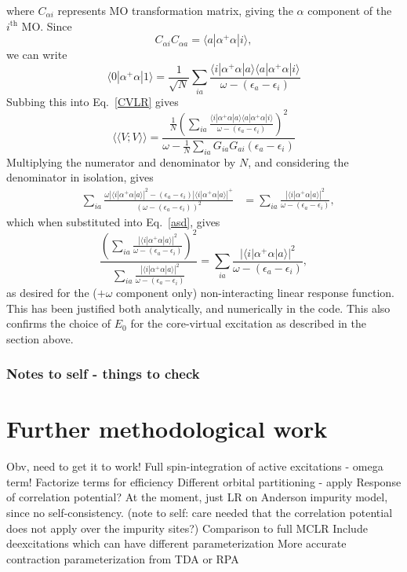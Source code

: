 \documentclass[a4paper,oneside,11pt]{article}
\numberwithin{equation}{section}
\begin{document}
where $C_{\alpha i}$ represents MO transformation matrix, giving the $\alpha$ component of the $i^{\textrm{th}}$ MO.
Since
\begin{equation}
C_{\alpha i} C_{\alpha a} = \langle a | \alpha^{+} \alpha | i \rangle ,
\end{equation}
we can write
\begin{equation}
\langle 0 | \alpha^{+} \alpha | 1 \rangle = \frac{1}{\sqrt{N}} \sum_{ia} \frac{\langle i | \alpha^{+} \alpha | a \rangle \langle a | \alpha^{+} \alpha | i \rangle}{\omega - (\epsilon_a - \epsilon_i)}
\end{equation}
Subbing this into Eq.~\ref{CVLR} gives
\begin{equation}
\langle \langle V ; V \rangle \rangle = \frac{ \frac{1}{N} \left( \sum_{ia} \frac{\langle i | \alpha^{+} \alpha | a \rangle \langle a | \alpha^{+} \alpha | i \rangle }{ \omega - (\epsilon_a - \epsilon_i)} \right)^2}{\omega - \frac{1}{N} \sum_{ia} G_{ia} G_{ai} (\epsilon_a - \epsilon_i)} \label{asd}
\end{equation}
Multiplying the numerator and denominator by $N$, and considering the denominator in isolation, gives
\begin{align}
& \sum_{ia} \frac{\omega|\langle i | \alpha^{+} \alpha | a \rangle |^2 - (\epsilon_a - \epsilon_i) |\langle i | \alpha^{+} \alpha | a \rangle |^{+}}{(\omega - (\epsilon_a - \epsilon_i))^2}
&=\sum_{ia} \frac{|\langle i | \alpha^{+} \alpha | a \rangle|^2}{\omega - (\epsilon_a - \epsilon_i)} , 
\end{align}
which when substituted into Eq.~\ref{asd}, gives
\begin{equation}
\frac{ \left( \sum_{ia} \frac{|\langle i | \alpha^{+} \alpha | a \rangle |^2}{\omega - (\epsilon_a - \epsilon_i)} \right)^2}{\sum_{ia} \frac{|\langle i | \alpha^{+} \alpha | a \rangle |^2}{\omega - (\epsilon_a - \epsilon_i)}} = \sum_{ia} \frac{|\langle i | \alpha^{+} \alpha | a \rangle |^2}{\omega - (\epsilon_a - \epsilon_i)} ,
\end{equation}
as desired for the ($+ \omega$ component only) non-interacting linear response function. This has been justified both analytically, and numerically in the code.
This also confirms the choice of $E_0$ for the core-virtual excitation as described in the section above.

\subsubsection{Notes to self - things to check}

\section{Further methodological work}
Obv, need to get it to work!
Full spin-integration of active excitations
- omega term!
Factorize terms for efficiency
Different orbital partitioning - apply
Response of correlation potential? At the moment, just LR on Anderson impurity model, since no self-consistency. (note to self: care needed that the correlation potential does not apply over the impurity sites?)
Comparison to full MCLR
Include deexcitations which can have different parameterization
More accurate contraction parameterization from TDA or RPA
\end{document}
